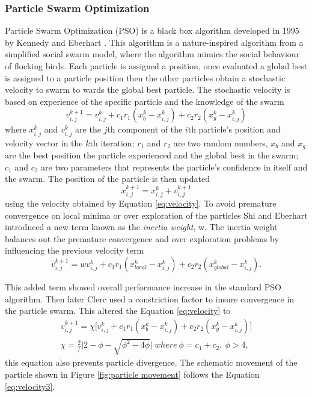 \subsubsection{Particle Swarm Optimization}
Particle Swarm Optimization (PSO) is a black box algorithm developed in 1995 by Kennedy and Eberhart \cite{Kennedy}. This algorithm is a nature-inspired algorithm from a simplified social swarm model, where the algorithm mimics the social behaviour of flocking birds. Each particle is assigned a position, once evaluated a global best is assigned to a particle position then the other particles obtain a stochastic velocity to swarm to wards the global best particle. The stochastic velocity is
based on experience of the specific particle and the knowledge of the swarm
\begin{equation}
    \label{eq:velocity}
    v^{k+1}_{i,j} = v^{k}_{i,j} + c_1r_1(x^{k}_b - x^{k}_{i,j}) + c_2r_2(x^{k}_g - x^{k}_{i,j})
\end{equation}
where $x^k_{i,j}$ and $v^k_{i,j}$ are the $j$th component of the $i$th particle's position and velocity vector in the $k$th iteration; $r_1$ and $r_2$ are two random numbers, $x_b$ and $x_g$ are the best position the particle experienced and the global best in the swarm; $c_1$ and $c_2$ are two parameters that represents the particle's confidence in itself and the swarm. The position of the particle is then updated 
\begin{equation}
    \label{eq:position}
    x^{k+1}_{i,j} = x^k_{i,j} + v^{k+1}_{i,j}
\end{equation}
using the velocity obtained by Equation \ref{eq:velocity}. To avoid premature convergence on local minima or over exploration of the particles Shi and Eberhart \cite{} introduced a new term known as the \textit{inertia weight}, w. The inertia weight balances out the premature convergence and over exploration problems by influencing the previous velocity term
\begin{equation}
    \label{eq:velocity2}
    v^{k+1}_{i,j} = wv^{k}_{i,j} + c_1r_1(x^{k}_{local} - x^{k}_{i,j}) + c_2r_2(x^{k}_{global} - x^{k}_{i,j}).
\end{equation}

This added term showed overall performance increase in the standard PSO algorithm. Then later Clerc \cite{} used a constriction factor to insure convergence in the particle swarm. This altered the Equation \ref{eq:velocity} to 
\begin{align}
    \label{eq:velocity3}
    v^{k+1}_{i,j} = \chi \big[ v^{k}_{i,j} + c_1r_1(x^{k}_b - x^{k}_{i,j}) + c_2r_2(x^{k}_g - x^{k}_{i,j}) \big] \\
    \chi = \frac{2}/{\big| 2- \phi - \sqrt{\phi^2 - 4\phi}\big|}\ where\ \phi = c_1 + c_2,\ \phi>4,
\end{align}
this equation also prevents particle divergence. The schematic movement of the particle shown in Figure \ref{fig:particle movement} follows the Equation \ref{eq:velocity3}.


